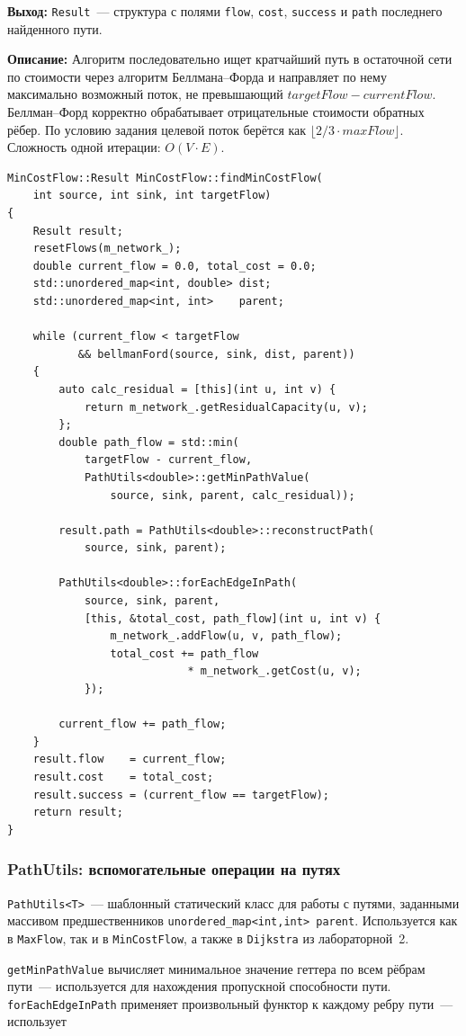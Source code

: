 \textbf{Выход:} \texttt{Result}~--- структура с полями \texttt{flow},
\texttt{cost}, \texttt{success} и \texttt{path} последнего найденного пути.

\textbf{Описание:} Алгоритм последовательно ищет кратчайший путь
в остаточной сети по стоимости через алгоритм Беллмана--Форда
и направляет по нему максимально возможный поток, не превышающий
$\mathit{targetFlow} - \mathit{currentFlow}$. Беллман--Форд
корректно обрабатывает отрицательные стоимости обратных рёбер.
По условию задания целевой поток берётся как $\lfloor 2/3 \cdot
\mathit{maxFlow} \rfloor$. Сложность одной итерации: $O(V \cdot E)$.

\begin{lstlisting}[style=cppstyle, caption={Поток минимальной стоимости (MinCostFlow.cc)}]
MinCostFlow::Result MinCostFlow::findMinCostFlow(
    int source, int sink, int targetFlow)
{
    Result result;
    resetFlows(m_network_);
    double current_flow = 0.0, total_cost = 0.0;
    std::unordered_map<int, double> dist;
    std::unordered_map<int, int>    parent;

    while (current_flow < targetFlow
           && bellmanFord(source, sink, dist, parent))
    {
        auto calc_residual = [this](int u, int v) {
            return m_network_.getResidualCapacity(u, v);
        };
        double path_flow = std::min(
            targetFlow - current_flow,
            PathUtils<double>::getMinPathValue(
                source, sink, parent, calc_residual));

        result.path = PathUtils<double>::reconstructPath(
            source, sink, parent);

        PathUtils<double>::forEachEdgeInPath(
            source, sink, parent,
            [this, &total_cost, path_flow](int u, int v) {
                m_network_.addFlow(u, v, path_flow);
                total_cost += path_flow
                            * m_network_.getCost(u, v);
            });

        current_flow += path_flow;
    }
    result.flow    = current_flow;
    result.cost    = total_cost;
    result.success = (current_flow == targetFlow);
    return result;
}
\end{lstlisting}

\subsubsection{PathUtils: вспомогательные операции на путях}

\texttt{PathUtils<T>}~--- шаблонный статический класс для работы
с путями, заданными массивом предшественников
\texttt{unordered\_map<int,int> parent}. Используется как в
\texttt{MaxFlow}, так и в \texttt{MinCostFlow}, а также в
\texttt{Dijkstra} из лабораторной~2.

\texttt{getMinPathValue} вычисляет минимальное значение геттера
по всем рёбрам пути~--- используется для нахождения
пропускной способности пути. \texttt{forEachEdgeInPath} применяет
произвольный функтор к каждому ребру пути~--- использует
